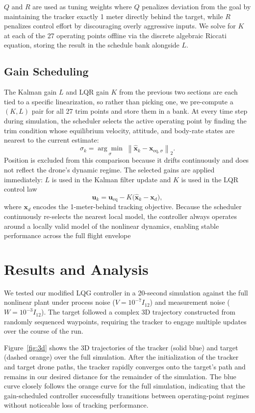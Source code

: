 \documentclass[11pt]{amsart}
\begin{document}
$Q$ and $R$ are used as tuning weights where $Q$ penalizes deviation from the goal by maintaining the tracker exactly 1 meter directly behind the target, while $R$ penalizes control effort by discouraging overly aggressive inputs. We solve for $K$ at each of the 27 operating points offline via the discrete algebraic Riccati equation, storing the result in the schedule bank alongside $L$.

\subsection{Gain Scheduling}

The Kalman gain $L$ and LQR gain $K$ from the previous two sections are each tied to a specific linearization, so rather than picking one, we pre-compute a $(K, L)$ pair for all 27 trim points and store them in a bank. At every time step during simulation, the scheduler selects the active operating point by finding the trim condition whose equilibrium velocity, attitude, and body-rate states are nearest to the current estimate:
\[
\sigma_k = \underset{\sigma}{\arg\min}\;\left\|\hat{\mathbf{x}}_k - \mathbf{x}_{\mathrm{eq},\sigma}\right\|_2.
\]
Position is excluded from this comparison because it drifts continuously and does not reflect the drone's dynamic regime. The selected gains are applied immediately: $L$ is used in the Kalman filter update and $K$ is used in the LQR control law
\[
\mathbf{u}_k = \mathbf{u}_{\mathrm{eq}} - K\bigl(\hat{\mathbf{x}}_k - \mathbf{x}_d\bigr),
\]
where $\mathbf{x}_d$ encodes the 1-meter-behind tracking objective. Because the scheduler continuously re-selects the nearest local model, the controller always operates around a locally valid model of the nonlinear dynamics, enabling stable performance across the full flight envelope



\section{\textbf{Results and Analysis}}

We tested our modified LQG controller in a 20-second simulation against the full nonlinear plant under process noise ($V = 10^{-7}I_{12}$) and measurement noise ($W = 10^{-3}I_{12}$). The target followed a complex 3D trajectory constructed from randomly sequenced waypoints, requiring the tracker to engage multiple updates over the course of the run.

Figure~\ref{fig:3d} shows the 3D trajectories of the tracker (solid blue) and target (dashed orange) over the full simulation. After the initialization of the tracker and target drone paths, the tracker rapidly converges onto the target's path and remains in our desired distance for the remainder of the simulation. The blue curve closely follows the orange curve for the full simulation, indicating that the gain-scheduled controller successfully transitions between operating-point regimes without noticeable loss of tracking performance.
\end{document}
